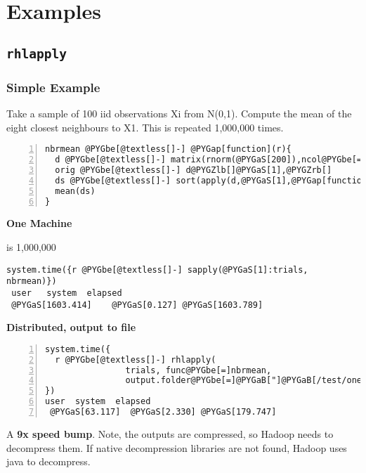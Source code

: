 \documentclass[letterpaper,10pt,english]{manual}
\begin{document}
\resetcurrentobjects
\hypertarget{--doc-examples}{}

\chapter{Examples}


\section{\texttt{rhlapply}}


\subsection{Simple Example}

Take a sample of 100 iid observations Xi from N(0,1). Compute the mean of the eight closest neighbours to X1. This is repeated 1,000,000 times.

\begin{Verbatim}[commandchars=@\[\],numbers=left,firstnumber=1,stepnumber=1]
nbrmean @PYGbe[@textless[]-] @PYGap[function](r){
  d @PYGbe[@textless[]-] matrix(rnorm(@PYGaS[200]),ncol@PYGbe[=]@PYGaS[2])
  orig @PYGbe[@textless[]-] d@PYGZlb[]@PYGaS[1],@PYGZrb[]
  ds @PYGbe[@textless[]-] sort(apply(d,@PYGaS[1],@PYGap[function](r) sqrt(sum((r@PYGbe[-]orig)@PYGbe[@textasciicircum[]]@PYGaS[2])))@PYGZlb[]@PYGaS[-1]@PYGZrb[])@PYGZlb[]@PYGaS[1]:@PYGaS[8]@PYGZrb[]
  mean(ds)
}
\end{Verbatim}

\textbf{One Machine}

 is 1,000,000

\begin{Verbatim}[commandchars=@\[\]]
system.time({r @PYGbe[@textless[]-] sapply(@PYGaS[1]:trials, nbrmean)})
 user   system  elapsed
 @PYGaS[1603.414]    @PYGaS[0.127] @PYGaS[1603.789]
\end{Verbatim}

\textbf{Distributed, output to file}

\begin{Verbatim}[commandchars=@\[\],numbers=left,firstnumber=1,stepnumber=1]
system.time({
  r @PYGbe[@textless[]-] rhlapply(
                trials, func@PYGbe[=]nbrmean,
                output.folder@PYGbe[=]@PYGaB["]@PYGaB[/test/one"])
})
user  system  elapsed
 @PYGaS[63.117]  @PYGaS[2.330] @PYGaS[179.747]
\end{Verbatim}

A \textbf{9x speed bump}. Note, the outputs are compressed, so Hadoop needs to decompress them. If native decompression libraries are not found, Hadoop uses java to decompress.
\end{document}
